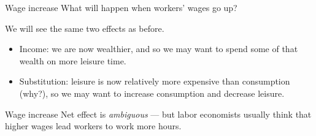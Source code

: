\documentclass[aspectratio=169]{beamer}
\begin{document}
\begin{frame}{Wage increase}
    What will happen when workers' wages go up?

    \vspace{2mm}

    We will see the same two effects as before.
    \begin{itemize}
        \item Income: we are now wealthier, and so we may want to spend some of that wealth on more leisure time.
        \item   Substitution: leisure is now relatively more expensive than consumption (why?), so we may want to increase consumption and decrease leisure.
    \end{itemize}
 
\end{frame}

\begin{frame}{Wage increase}
    Net effect is \textit{ambiguous} --- but labor economists usually think that higher wages lead workers to work more hours. 
\end{frame}
\end{document}
